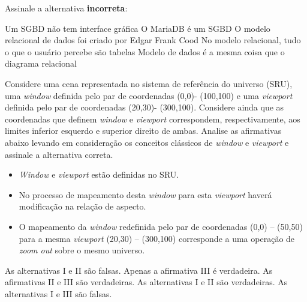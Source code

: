 \documentclass[12pt, addpoints]{exam}
\begin{document}
    \begin{questions}

    \newpage
    \question Assinale a alternativa \textbf{incorreta}:
\begin{choices}
\choice Um SGBD não tem interface gráfica
\choice O MariaDB é um SGBD
\choice O modelo relacional de dados foi criado por Edgar Frank Cood
\choice No modelo relacional, tudo o que o usuário percebe são tabelas
\choice Modelo de dados é a mesma coisa que o diagrama relacional
\end{choices}

\question

Considere uma cena representada no sistema de referência do universo (SRU), uma \textit{window} definida pelo par de coordenadas (0,0)- (100,100) e uma \textit{viewport} definida pelo par de coordenadas (20,30)- (300,100). Considere ainda que as coordenadas que definem \textit{window} e \textit{viewport} correspondem, respectivamente, aos limites inferior esquerdo e superior direito de ambas. Analise as afirmativas abaixo levando em consideração os conceitos clássicos de \textit{window} e \textit{viewport} e assinale a alternativa correta.



\begin{itemize}

    \item[I)] \textit{Window} e \textit{viewport} estão definidas no SRU.

    \item[II)] No processo de mapeamento desta \textit{window} para esta \textit{viewport} haverá modificação na relação de aspecto.

    \item[III)] O mapeamento da \textit{window} redefinida pelo par de coordenadas (0,0) – (50,50) para a mesma \textit{viewport} (20,30) – (300,100) corresponde a uma operação de \textit{zoom out} sobre o mesmo universo.

\end{itemize}
\begin{choices}
\choice As alternativas I e II são falsas.
\choice Apenas a afirmativa III é verdadeira.
\choice As afirmativas II e III são verdadeiras.
\choice As alternativas I e II são verdadeiras.
\choice As alternativas I e III são falsas.
\end{choices}


\end{questions}
\end{document}
